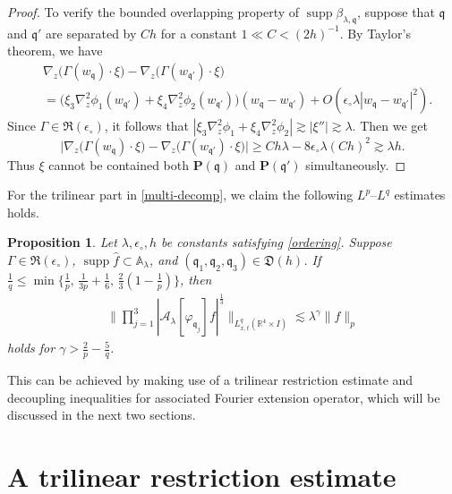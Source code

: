 \documentclass[10pt] %
{amsart}
\theoremstyle{plain}
\newtheorem{prop}[thm]{Proposition}
\numberwithin{equation}{section}
\newcommand{\R}{\mathbb R}
\DeclareMathOperator{\supp}{supp}
\newcommand{\fq}{\mathfrak q}
\begin{document}
\begin{proof}
To verify the bounded overlapping property of $\supp \beta_{\lambda,\fq}$, suppose that $\fq$ and $\fq'$ are separated by $C h$ for a constant $ 1 \ll C <(2h)^{-1}$. 
By Taylor's theorem, we have  
\begin{align*}
&\nabla_{z} \big(\Gamma(w_{\fq}) \cdot \xi\big)
-\nabla_{z} \big(\Gamma(w_{\fq'}) \cdot \xi \big)\\
& =\big(\xi_3 \nabla_z^2\phi_1(w_{\fq'})+\xi_4 \nabla_z^2\phi_2(w_{\fq'} )\big)(w_\fq-w_{\fq'}) + O( \epsilon_\circ \lambda |w_\fq -w_{\fq'}|^2).
\end{align*}
Since $\Gamma\in \mathfrak R(\epsilon_\circ)$, it follows that $ | \xi_3 \nabla_z^2\phi_1+\xi_4 \nabla_z^2\phi_2| \gtrsim |\xi''| \gtrsim \lambda $.
Then we get 
\begin{equation*}
\big|\nabla_{z} \big(\Gamma(w_{\fq}) \cdot \xi\big)
-\nabla_{z} \big(\Gamma(w_{\fq'}) \cdot \xi \big) \big|
\ge C h \lambda -   8\epsilon_\circ \lambda (Ch)^2  
\gtrsim \lambda h.  
\end{equation*}
Thus $\xi$ cannot be contained both $\mathbf P(\fq)$ and $\mathbf P(\fq')$ simultaneously. 
\end{proof}


For the trilinear part  in \eqref{multi-decomp}, we claim the following $L^p$--$L^q$ estimates holds.  


\begin{prop}\label{multi-interpol}
Let $\lambda, \epsilon_\circ, h$ be constants satisfying \eqref{ordering}.
Suppose $\Gamma \in \mathfrak R (\epsilon_\circ)$, $\supp \widehat f \subset \mathbb A_\lambda$,  and $(\mathfrak q_{1}, \mathfrak q_2, \mathfrak q_3) \in \mathfrak D(h)$.
If $\frac 1 q \le \min\{ \frac 1p,\, \frac 1{3p}+\frac16,\, \frac23(1-\frac1p)\}$, then
\begin{align}\label{tri-result}
\Big\| \prod_{j=1}^3 |\mathcal A_\lambda  [\varphi_{\mathfrak q_j}]f|^{\frac13} \Big\|_{L_{x,t}^q(\R^4\times I)} \lesssim \lambda^{ \gamma}
\|f\|_p
\end{align}
holds for $\gamma >   \frac2p-\frac5q$. 
\end{prop}

This can be achieved by making use of a trilinear restriction estimate and decoupling inequalities for associated Fourier extension operator, which will be discussed in the next two sections.   





\section{A trilinear restriction estimate}\label{TRI}
\end{document}
